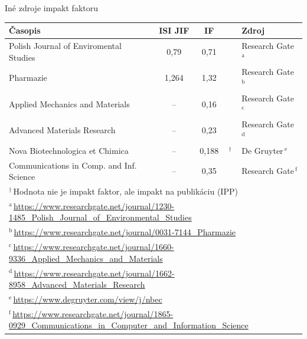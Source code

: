\documentclass{beamer}
\begin{document}
\begin{frame}{Iné zdroje impakt faktoru}
  \begin{table}
    \footnotesize
    \begin{tabular}{lcc@{\,}ll}
      \toprule
      Časopis & ISI JIF & IF &  & Zdroj \\
      \midrule
      Polish Journal of Enviromental Studies   & 0,79\phantom{0} & 0,71\phantom{0}&           & Research Gate\,$^{\mathrm{a}}$ \\[0.5ex]
      Pharmazie                                & 1,264           & 1,32\phantom{0}&           & Research Gate\,$^{\mathrm{b}}$ \\[0.5ex]
      Applied Mechanics and Materials          & --              & 0,16\phantom{0}&           & Research Gate\,$^{\mathrm{c}}$ \\[0.5ex]
      Advanced Materials Research              & --              & 0,23\phantom{0}&           & Research Gate\,$^{\mathrm{d}}$ \\[0.5ex]
      Nova Biotechnologica et Chimica          & --              & 0,188          &$^\dagger$ & De Gruyter\,$^{\mathrm{e}}$    \\[0.5ex]
      Communications in Comp. and Inf. Science & --              & 0,35\phantom{0}&           & Research Gate\,$^{\mathrm{f}}$ \\[0.5ex]
      \bottomrule
      \multicolumn{5}{l}{\tiny $^\dagger$\,Hodnota nie je impakt faktor, ale impakt na publikáciu (IPP)} \\
      \multicolumn{5}{l}{\tiny $^{\mathrm{a}}$\,\url{https://www.researchgate.net/journal/1230-1485\_Polish\_Journal\_of\_Environmental\_Studies}} \\
      \multicolumn{5}{l}{\tiny $^{\mathrm{b}}$\,\url{https://www.researchgate.net/journal/0031-7144\_Pharmazie}} \\
      \multicolumn{5}{l}{\tiny $^{\mathrm{c}}$\,\url{https://www.researchgate.net/journal/1660-9336\_Applied\_Mechanics\_and\_Materials}} \\
      \multicolumn{5}{l}{\tiny $^{\mathrm{d}}$\,\url{https://www.researchgate.net/journal/1662-8958\_Advanced\_Materials\_Research}} \\
      \multicolumn{5}{l}{\tiny $^{\mathrm{e}}$\,\url{https://www.degruyter.com/view/j/nbec}} \\
      \multicolumn{5}{l}{\tiny $^{\mathrm{f}}$\,\url{https://www.researchgate.net/journal/1865-0929\_Communications\_in\_Computer\_and\_Information\_Science}} \\
    \end{tabular}
  \end{table}
\end{frame}
\end{document}
